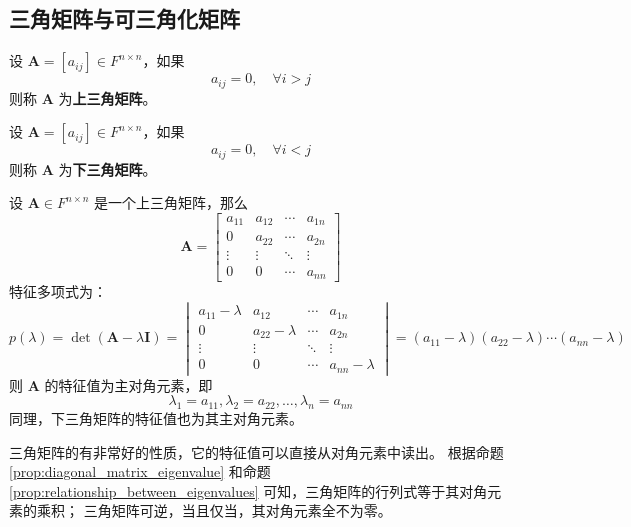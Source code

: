 \subsection{三角矩阵与可三角化矩阵}
\begin{definition}
    设 $\mathbf{A} = [a_{ij}] \in F^{n \times n}$，如果
    \[
        a_{ij} = 0, \quad \forall i > j
    \]
    则称 $\mathbf{A}$ 为\textbf{上三角矩阵}。
    \label{def:upper_triangular_matrix}
\end{definition}

\begin{definition}
    设 $\mathbf{A} = [a_{ij}] \in F^{n \times n}$，如果
    \[
        a_{ij} = 0, \quad \forall i < j
    \]
    则称 $\mathbf{A}$ 为\textbf{下三角矩阵}。
    \label{def:lower_triangular_matrix}
\end{definition}

\begin{proposition}[三角矩阵的主对角元素即为它的特征值]
    设 $\mathbf{A} \in F^{n \times n}$ 是一个上三角矩阵，那么
    \[
        \mathbf{A} = \begin{bmatrix}
            a_{11} & a_{12} & \cdots & a_{1n} \\
            0 & a_{22} & \cdots & a_{2n} \\
            \vdots & \vdots & \ddots & \vdots \\
            0 & 0 & \cdots & a_{nn}
        \end{bmatrix}
    \]
    特征多项式为：
    \[
        p(\lambda) = \det(\mathbf{A} - \lambda \mathbf{I}) = \begin{vmatrix}
            a_{11} - \lambda & a_{12} & \cdots & a_{1n} \\
            0 & a_{22} - \lambda & \cdots & a_{2n} \\
            \vdots & \vdots & \ddots & \vdots \\
            0 & 0 & \cdots & a_{nn} - \lambda
        \end{vmatrix} = (a_{11} - \lambda)(a_{22} - \lambda) \cdots (a_{nn} - \lambda)
    \]
    则 $\mathbf{A}$ 的特征值为主对角元素，即
    \[
        \lambda_1 = a_{11}, \lambda_2 = a_{22}, \ldots, \lambda_n = a_{nn}
    \]
    同理，下三角矩阵的特征值也为其主对角元素。
    \label{prop:triangular_matrix_eigenvalue}
\end{proposition}

\begin{note}
    三角矩阵的有非常好的性质，它的特征值可以直接从对角元素中读出。
    根据命题 \ref{prop:diagonal_matrix_eigenvalue} 和命题 \ref{prop:relationship_between_eigenvalues} 可知，三角矩阵的行列式等于其对角元素的乘积；
    三角矩阵可逆，当且仅当，其对角元素全不为零。
\end{note}

